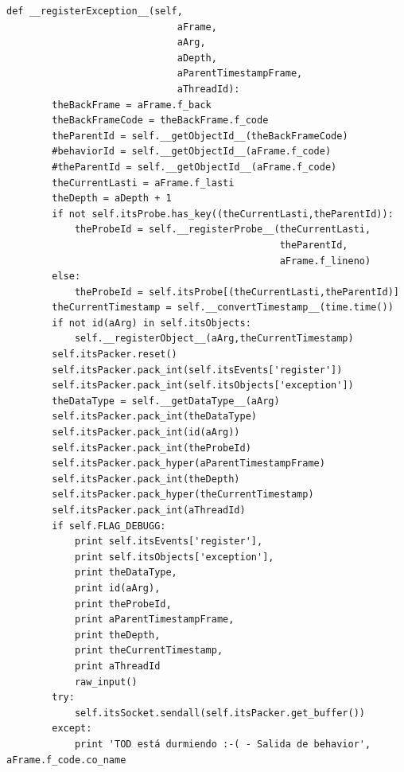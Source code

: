 \documentclass[12pt,legalpaper]{report}
\begin{document}
\begin{singlespace}
\begin{lstlisting}[style=Python]
    def __registerException__(self,
                              aFrame,
                              aArg,
                              aDepth,
                              aParentTimestampFrame,
                              aThreadId):
        theBackFrame = aFrame.f_back
        theBackFrameCode = theBackFrame.f_code
        theParentId = self.__getObjectId__(theBackFrameCode)
        #behaviorId = self.__getObjectId__(aFrame.f_code)
        #theParentId = self.__getObjectId__(aFrame.f_code)
        theCurrentLasti = aFrame.f_lasti
        theDepth = aDepth + 1
        if not self.itsProbe.has_key((theCurrentLasti,theParentId)):
            theProbeId = self.__registerProbe__(theCurrentLasti,
                                                theParentId,
                                                aFrame.f_lineno)
        else:
            theProbeId = self.itsProbe[(theCurrentLasti,theParentId)]
        theCurrentTimestamp = self.__convertTimestamp__(time.time())       
        if not id(aArg) in self.itsObjects:
            self.__registerObject__(aArg,theCurrentTimestamp)            
        self.itsPacker.reset()
        self.itsPacker.pack_int(self.itsEvents['register'])
        self.itsPacker.pack_int(self.itsObjects['exception'])       
        theDataType = self.__getDataType__(aArg)
        self.itsPacker.pack_int(theDataType)
        self.itsPacker.pack_int(id(aArg))
        self.itsPacker.pack_int(theProbeId)
        self.itsPacker.pack_hyper(aParentTimestampFrame)        
        self.itsPacker.pack_int(theDepth)
        self.itsPacker.pack_hyper(theCurrentTimestamp)
        self.itsPacker.pack_int(aThreadId)
        if self.FLAG_DEBUGG:
            print self.itsEvents['register'],
            print self.itsObjects['exception'],
            print theDataType,
            print id(aArg),
            print theProbeId,
            print aParentTimestampFrame,
            print theDepth,
            print theCurrentTimestamp,
            print aThreadId
            raw_input()
        try:
            self.itsSocket.sendall(self.itsPacker.get_buffer())
        except:
            print 'TOD está durmiendo :-( - Salida de behavior', aFrame.f_code.co_name


\end{lstlisting}
\end{singlespace}
\end{document}
